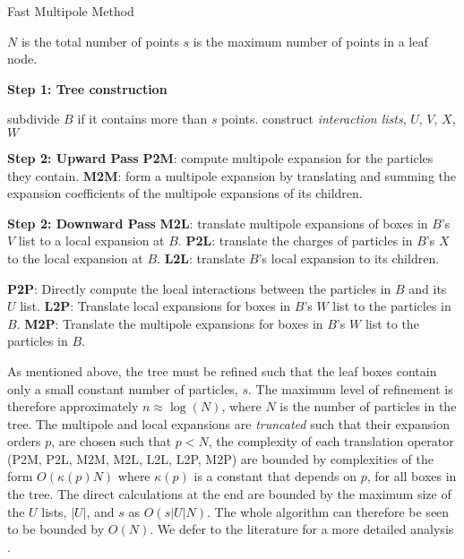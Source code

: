 \begin{algorithm}
\caption{Fast Multipole Method}
\label{alg:fmm:app_a_1}
\begin{algorithmic}

    \State $N$ is the total number of points
    \State $s$ is the maximum number of points in a leaf node.

    \State
    \State \textbf{Step 1: Tree construction}
    
        \State subdivide $B$ if it contains more than $s$ points.
    \EndFor
        \State construct \textit{interaction lists}, $U$, $V$, $X$, $W$
    \EndFor
    
    \State 
    \State \textbf{Step 2: Upward Pass}
    \State \textbf{P2M}: compute multipole expansion for the particles they contain.
    \EndFor
    \State \textbf{M2M}: form a multipole expansion by translating and summing the expansion coefficients of the multipole expansions of its children.
    \EndFor

    \State
    \State \textbf{Step 2: Downward Pass}
    \State \textbf{M2L}: translate multipole expansions of boxes in $B$'s $V$ list to a local expansion at $B$.
    \State \textbf{P2L}: translate the charges of particles in $B$'s $X$ to the local expansion at $B$.
    \State \textbf{L2L}: translate $B$'s local expansion to its children.
    \EndFor 

    \State \textbf{P2P}: Directly compute the local interactions between the particles in $B$ and its $U$ list.
    \State \textbf{L2P}: Translate local expansions for boxes in $B$'s $W$ list to the particles in $B$.
    \State \textbf{M2P}: Translate the multipole expansions for boxes in $B$'s $W$ list to the particles in $B$.
    \EndFor

\end{algorithmic}
\end{algorithm}

As mentioned above, the tree must be refined such that the leaf boxes contain only a small constant number
of particles, $s$. The maximum level of refinement is therefore approximately $n \approx \log(N)$, where $N$ is the number of particles in the tree. The multipole and local expansions are \textit{truncated} such that their expansion orders $p$, are chosen such that $p < N$,  the complexity of each translation operator (P2M, P2L, M2M, M2L, L2L, L2P, M2P) are bounded by complexities of the form $O(\kappa(p)N)$ where $\kappa(p)$ is a constant that depends on $p$, for all boxes in the tree. The direct calculations at the end are bounded by the maximum size of the $U$ lists, $|U|$, and $s$ as $O(s|U|N)$. The whole algorithm can therefore be seen to be bounded by $O(N)$. We defer to the literature for a more detailed analysis \cite{greengard1987fast}.